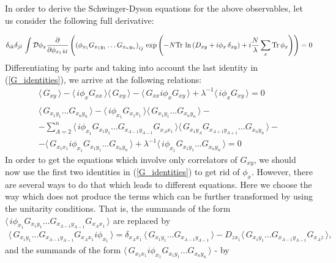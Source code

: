 \documentclass[twocolumn,showpacs,preprintnumbers,superscriptaddress,amsmath,floatfix,amssymb,secnumarabic]{revtex4}
\newcommand{\lr}[1]{ \left( #1 \right) }
\newcommand{\vev}[1]{ \langle \, #1 \, \rangle }
\newcommand{\tr}{ {\rm Tr} \, }
\newcommand{\expa}[1]{ \exp{\left( #1 \right)} }
\begin{document}
 In order to derive the Schwinger-Dyson equations for the above observables, let us consider the following full derivative:
\begin{widetext}
\begin{eqnarray}
\label{sd_derivation1}
 \delta_{ik} \delta_{jl} \, \int\mathcal{D}\phi_x \frac{\partial}{\partial \phi_{x_1 \, kl}}
 \lr{ \lr{\phi_{x_1} G_{x_1 y_1} \ldots G_{x_n y_n}}_{ij} \,
 \expa{- N \tr\ln\lr{D_{xy} + i \phi_x \, \delta_{xy}} + i \frac{N}{\lambda} \sum\limits_x \tr \phi_x } } = 0
\end{eqnarray}
Differentiating by parts and taking into account the last identity in (\ref{G_identities}), we arrive at the following relations:
\begin{eqnarray}
\label{sd_derivation2_lowest}
 \vev{G_{x y}} - \vev{i \phi_x G_{x x}} \vev{G_{x y}}
 - \vev{G_{x x} i \phi_x G_{x y} } + \lambda^{-1} \vev{i \phi_x G_{x y}} = 0\\{}\nonumber\\
\label{sd_derivation2}
 \vev{G_{x_1 y_1} \ldots G_{x_n y_n}} - \vev{i \phi_{x_1} G_{x_1 x_1}} \vev{G_{x_1 y_1} \ldots G_{x_n y_n}}
 - \nonumber \\ -
 \sum\limits_{A=2}^{n} \vev{i \phi_{x_1} G_{x_1 y_1} \ldots G_{x_{A-1}y_{A-1}} G_{x_A x_1}} \vev{G_{x_1 y_A} G_{x_{A+1}y_{A+1}} \ldots G_{x_n y_n}}
 - \nonumber \\ -
 \vev{G_{x_1 x_1} i \phi_{x_1} G_{x_1 y_1} \ldots G_{x_n y_n}}
 + \lambda^{-1} \vev{i \phi_{x_1} G_{x_1 y_1} \ldots G_{x_n y_n} } = 0
\end{eqnarray}
In order to get the equations which involve only correlators of $G_{x y}$, we should now use the first two identities in (\ref{G_identities}) to get rid of $\phi_x$. However, there are several ways to do that which leads to different equations. Here we choose the way which does not produce the terms which can be further transformed by using the unitarity conditions. That is, the summands of the form $\vev{i \phi_{x_1} G_{x_1 y_1} \ldots G_{x_{A-1}y_{A-1}} G_{x_A x_1}}$ are replaced by
\begin{eqnarray}
\label{phix_replacement1}
 \vev{ G_{x_1 y_1} \ldots G_{x_{A-1}y_{A-1}} G_{x_A x_1} i \phi_{x_1}} =
 \delta_{x_A x_1} \, \vev{ G_{x_1 y_1} \ldots G_{x_{A-1}y_{A-1}}} - D_{z x_1} \vev{ G_{x_1 y_1} \ldots G_{x_{A-1}y_{A-1}} G_{x_A z} } ,
\end{eqnarray}
and the summands of the form $\vev{G_{x_1 x_1} i \phi_{x_1} G_{x_1 y_1} \ldots G_{x_n y_n}}$ - by
\begin{eqnarray}
\label{phix_replacement2}

\end{eqnarray}
\end{widetext}
\end{document}
